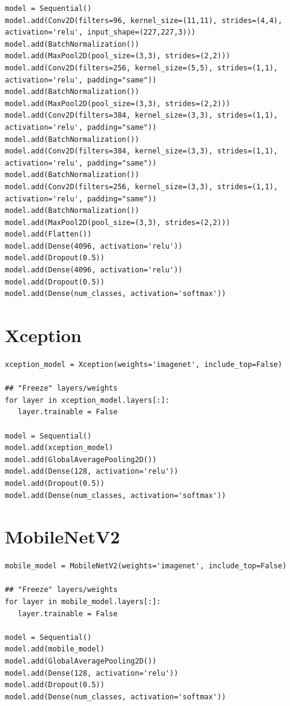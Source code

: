 \documentclass[
	12pt,				%
	openright,			%
	twoside,			%
	a4paper,			%
	english,			%
	brazil,				%
	svgnames
	]{abntex2}\usepackage[]{graphicx}\usepackage[]{color}
\begin{document}
\begin{lstlisting}
model = Sequential()
model.add(Conv2D(filters=96, kernel_size=(11,11), strides=(4,4), activation='relu', input_shape=(227,227,3)))
model.add(BatchNormalization())
model.add(MaxPool2D(pool_size=(3,3), strides=(2,2)))
model.add(Conv2D(filters=256, kernel_size=(5,5), strides=(1,1), activation='relu', padding="same"))
model.add(BatchNormalization())
model.add(MaxPool2D(pool_size=(3,3), strides=(2,2)))
model.add(Conv2D(filters=384, kernel_size=(3,3), strides=(1,1), activation='relu', padding="same"))
model.add(BatchNormalization())
model.add(Conv2D(filters=384, kernel_size=(3,3), strides=(1,1), activation='relu', padding="same"))
model.add(BatchNormalization())
model.add(Conv2D(filters=256, kernel_size=(3,3), strides=(1,1), activation='relu', padding="same"))
model.add(BatchNormalization())
model.add(MaxPool2D(pool_size=(3,3), strides=(2,2)))
model.add(Flatten())
model.add(Dense(4096, activation='relu'))
model.add(Dropout(0.5))
model.add(Dense(4096, activation='relu'))
model.add(Dropout(0.5))
model.add(Dense(num_classes, activation='softmax'))

\end{lstlisting}
 
 \section{Xception}

\begin{lstlisting}
xception_model = Xception(weights='imagenet', include_top=False)

## "Freeze" layers/weights
for layer in xception_model.layers[:]:
   layer.trainable = False

model = Sequential()
model.add(xception_model)
model.add(GlobalAveragePooling2D())
model.add(Dense(128, activation='relu'))
model.add(Dropout(0.5))
model.add(Dense(num_classes, activation='softmax'))

\end{lstlisting}

\section{MobileNetV2}

\begin{lstlisting}
mobile_model = MobileNetV2(weights='imagenet', include_top=False)

## "Freeze" layers/weights
for layer in mobile_model.layers[:]:
   layer.trainable = False

model = Sequential()
model.add(mobile_model)
model.add(GlobalAveragePooling2D())
model.add(Dense(128, activation='relu'))
model.add(Dropout(0.5))
model.add(Dense(num_classes, activation='softmax'))

\end{lstlisting}
\end{document}
